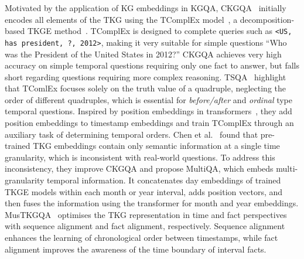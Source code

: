 {Motivated by the application of KG embeddings in KGQA, \textnormal{C{}KGQA}~\cite{saxenaQuestionAnsweringTemporal2021} initially encodes all elements of the TKG using the TComplEx model~\cite{lacroixTensorDecompositionsTemporal2020}, a decomposition-based TKGE method~\cite{caiTemporalKnowledgeGraph2023}. TComplEx is designed to complete queries such as \texttt{<US, has president, ?, 2012>}, making it very suitable for simple questions ``Who was the President of the United States in 2012?'' \textnormal{C{}KGQA} achieves very high accuracy on simple temporal questions requiring only one fact to answer, but falls short regarding questions requiring more complex reasoning. 
TSQA~\cite{shangImprovingTimeSensitivity2022} highlight that TComlEx focuses solely on the truth value of a quadruple, neglecting the order of different quadruples, which is essential for \textit{before/after} and \textit{ordinal} type temporal questions. Inspired by position embeddings in transformers~\cite{vaswaniAttentionAllYou2023}, they add position embeddings to timestamp embeddings and train TComplEx through an auxiliary task of determining temporal orders.
Chen et al.~\cite{chenMultigranularityTemporalQuestion2023} found that pre-trained TKG embeddings contain only semantic information at a single time granularity, which is inconsistent with real-world questions.
To address this inconsistency, they improve \textnormal{C{}KGQA} and propose MultiQA, which embeds multi-granularity temporal information. It concatenates day embeddings of trained TKGE models within each month or year interval, adds position vectors, and then fuses the information using the transformer for month and year embeddings.
MusTKGQA~\cite{zhangMusTQTemporalKnowledge2024} optimises the TKG representation in time and fact perspectives with sequence alignment and fact alignment, respectively. Sequence alignment enhances the learning of chronological order between timestamps, while fact alignment improves the awareness of the time boundary of interval facts.


}
